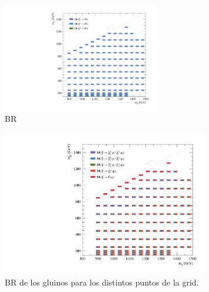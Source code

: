 \begin{figure}[!htbp]
  \centering

  \includegraphics[width=0.6\textwidth]{figures/br_n1_X}

  \caption{BR}
  \label{fig:signal_br_n1}
\end{figure}




\begin{figure}[h]
  \centering
  \includegraphics[width=0.8\textwidth]{figures/br_gl_X}
  \caption{BR de los gluinos para los distintos puntos de la grid.}
\end{figure}




